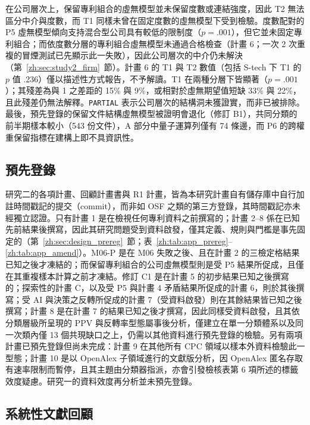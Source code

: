 在公司層次上，保留專利組合的虛無模型並未保留度數或連結強度，因此 T2 無法區分中介與度數，而 T1 同樣未曾在固定度數的虛無模型下受到檢驗。度數配對的 P5 虛無模型傾向支持混合型公司具有較低的限制度（$p=.001$），但它並未固定專利組合；而依度數分層的專利組合虛無模型未通過合格檢查（計畫 6；一次 2 次重複的冒煙測試已先顯示此一失敗），因此公司層次的中介仍未解決（第~\ref{zh:sec:study2_firm}~節）。計畫 6 的 T1 與 T2 數值（包括 S-tech 下 T1 的 $p$ 值 .236）僅以描述性方式報告，不予解讀。T1 在兩種分層下皆顯著（$p=.001$）；其殘差為與 1 之差距的 15\% 與 9\%，或相對於虛無期望值短缺 33\% 與 22\%，且此殘差仍無法解釋。\texttt{PARTIAL} 表示公司層次的結構洞未獲證實，而非已被排除。最後，預先登錄的保留文件結構虛無模型被證明會退化（修訂 B1），共同分類的前半期樣本較小（543 份文件），A 部分中量子運算列僅有 74 條邊，而 P6 的跨權重保留指標在建構上即不具資訊性。

\subsection{預先登錄}
\label{zh:sec:lim_prereg}

研究二的各項計畫、回顧計畫書與 R1 計畫，皆為本研究計畫自有儲存庫中自行加註時間戳記的提交（commit），而非如 OSF 之類的第三方登錄，其時間戳記亦未經獨立認證。只有計畫 1 是在檢視任何專利資料之前撰寫的；計畫 2--8 係在已知先前結果後撰寫，因此其研究問題受到資料啟發，僅其定義、規則與門檻是事先固定的（第~\ref{zh:sec:design_prereg}~節；表~\ref{zh:tab:app_prereg}--\ref{zh:tab:app_amend}）。M06-P 是在 M06 失敗之後、且在計畫 2 的三檢定格結果已知之後才凍結的；而保留專利組合的公司虛無模型則是受 P5 結果所促成，且僅在其重複樣本計算之前才凍結。修訂 C1 是在計畫 5 的初步結果已知之後撰寫的；探索性的計畫 C，以及受 P5 與計畫 4 矛盾結果所促成的計畫 6，則於其後撰寫；受 AI 與決策之反轉所促成的計畫 7（受資料啟發）則在其餘結果皆已知之後撰寫；計畫 8 是在計畫 7 的結果已知之後才撰寫，因此同樣受資料啟發，且其依分類層級所呈現的 PPV 與反轉率型態屬事後分析，僅建立在單一分類體系以及同一次類內僅 13 個共現缺口之上，仍需以其他資料進行預先登錄的檢驗。另有兩項計畫已預先登錄但尚未完成：計畫 9 在其他所有 CPC 領域以樣本外資料檢驗此一型態；計畫 10 是以 OpenAlex 子領域進行的文獻版分析，因 OpenAlex 匿名存取有速率限制而暫停，且其主題由分類器指派，亦會引發檢核表第 6 項所述的標籤效度疑慮。研究一的資料效度再分析並未預先登錄。

\subsection{系統性文獻回顧}
\label{zh:sec:lim_review}

